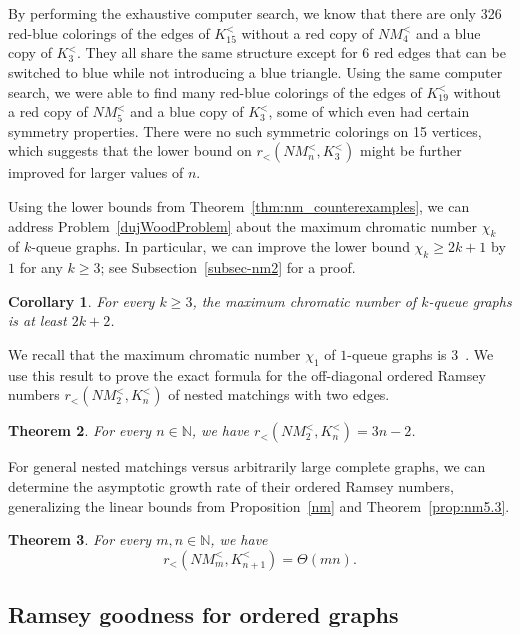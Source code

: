 \documentclass[11pt,a4paper]{article}
\newtheorem{thm}{Theorem}%
\newtheorem{cor}[thm]{Corollary}
\theoremstyle{remark}
\begin{document}
By performing the exhaustive computer search, we know that there are only 326 red-blue colorings of the edges of $K^<_{15}$ without a red copy of $NM^<_4$ and a blue copy of $K^<_3$.
They all share the same structure except for 6 red edges that can be switched to blue while not introducing a blue triangle. 
Using the same computer search, we were able to find many red-blue colorings of the edges of $K^<_{19}$ without a red copy of $NM^<_5$ and a blue copy of $K^<_3$, some of which even had certain symmetry properties.
There were no such symmetric colorings on 15 vertices, which suggests that the lower bound on $r_<(NM^<_n,K^<_3)$ might be further improved for larger values of $n$.

Using the lower bounds from Theorem~\ref{thm:nm_counterexamples}, we can address Problem~\ref{dujWoodProblem} about the maximum chromatic number $\chi_k$ of $k$-queue graphs.
In particular, we can improve the lower bound $\chi_k \geq 2k+1$ by $1$ for any $k \geq 3$; see Subsection~\ref{subsec-nm2} for a proof.

\begin{cor}
\label{cor-chromatic}
For every $k \geq 3$, the maximum chromatic number of $k$-queue graphs is at least $2k+2$.
\end{cor}

We recall that the maximum chromatic number $\chi_1$ of $1$-queue graphs is $3$~\cite{dujWoo10}.
We use this result to prove the exact formula for the off-diagonal ordered Ramsey numbers $r_<(NM^<_2,K^<_n)$ of nested matchings with two edges.

\begin{thm}
\label{prop:nm2}
For every $n\in\mathbb{N}$, we have $r_<(NM^<_2,K^<_n)=3n-2$.
\end{thm}

For general nested matchings versus arbitrarily large complete graphs, we can determine the asymptotic growth rate of their ordered Ramsey numbers, generalizing the linear bounds from Proposition~\ref{nm} and Theorem~\ref{prop:nm5.3}.

\begin{thm}
\label{thm:linearni_matchingy}
For every $m,n\in\mathbb{N}$, we have
\[r_<(NM^<_m,K^<_{n+1}) = \Theta(mn).\]
\end{thm}



\subsection{Ramsey goodness for ordered graphs}
\label{subsec:goodness}
\end{document}
